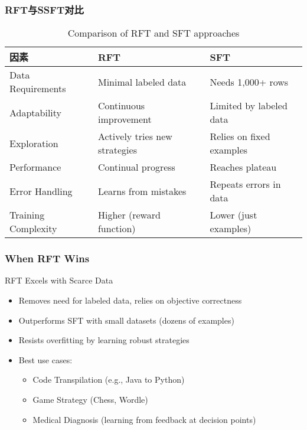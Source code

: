 \documentclass[aspectratio=169]{beamer}
\begin{document}
\begin{frame}
	\frametitle{RFT与SSFT对比}
	\begin{table}
		\footnotesize
		\begin{tabular}{|p{3cm}|p{3cm}|p{3cm}|}
			\hline
			\textbf{因素} & \textbf{RFT} & \textbf{SFT} \\
			\hline
			Data Requirements & Minimal labeled data & Needs 1,000+ rows \\
			\hline
			Adaptability & Continuous improvement & Limited by labeled data \\
			\hline
			Exploration & Actively tries new strategies & Relies on fixed examples \\
			\hline
			Performance & Continual progress & Reaches plateau \\
			\hline
			Error Handling & Learns from mistakes & Repeats errors in data \\
			\hline
			Training Complexity & Higher (reward function) & Lower (just examples) \\
			\hline
		\end{tabular}
		\caption{Comparison of RFT and SFT approaches}
	\end{table}
\end{frame}

\begin{frame}
	\frametitle{When RFT Wins}
	\begin{block}{RFT Excels with Scarce Data}
		\begin{itemize}
			\item Removes need for labeled data, relies on objective correctness
			\item Outperforms SFT with small datasets (dozens of examples)
			\item Resists overfitting by learning robust strategies
			\item Best use cases:
			\begin{itemize}
				\item Code Transpilation (e.g., Java to Python)
				\item Game Strategy (Chess, Wordle)
				\item Medical Diagnosis (learning from feedback at decision points)
			\end{itemize}
		\end{itemize}
	\end{block}
\end{frame}
\end{document}
